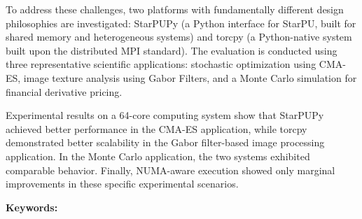 To address these challenges, two platforms with fundamentally different design philosophies are investigated: StarPUPy (a Python interface for StarPU, built for shared memory and heterogeneous systems) and torcpy (a Python-native system built upon the distributed MPI standard). The evaluation is conducted using three representative scientific applications: stochastic optimization using CMA-ES, image texture analysis using Gabor Filters, and a Monte Carlo simulation for financial derivative pricing.

Experimental results on a 64-core computing system show that StarPUPy achieved better performance in the CMA-ES application, while torcpy demonstrated better scalability in the Gabor filter-based image processing application. In the Monte Carlo application, the two systems exhibited comparable behavior. Finally, NUMA-aware execution showed only marginal improvements in these specific experimental scenarios.

\vfill
\noindent \textbf{Keywords:} \keywordsen